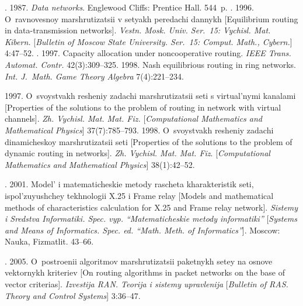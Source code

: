   \begin{multicols}{2}
  
  \renewcommand{\bibname}{\protect\rmfamily References}

{\small\frenchspacing
{%
\begin{thebibliography}{99}
  
  . 
  1987. \textit{Data networks}. Englewood Cliffs: Prentice Hall. 544~p.
. 
1996. O~ravnovesnoy marshrutizatsii v setyakh peredachi dannykh 
[Equilibrium routing in data-transmission networks]. 
\textit{Vestn. Mosk. Univ. Ser.~15: Vychisl. Mat. Kibern.}
[\textit{Bulletin of Moscow State University. Ser.~15: Comput. Math., Cybern.}] 4:47--52.
. 
1997. Capacity allocation under noncooperative routing. 
\textit{IEEE Trans. Automat. Contr.} 42(3):309--325.
 1998. 
Nash equilibrious routing in ring networks. \textit{Int. J.~Math. Game Theory Algebra}
7(4):221--234.
{

}
 1997. 
O~svoystvakh resheniy zadachi marshrutizatsii seti s virtual'nymi kanalami 
[Properties of the solutions to the problem of routing in network with virtual channels]. 
\textit{Zh. Vychisl. Mat. Mat. Fiz.} [\textit{Computational Mathematics and Mathematical 
Physics}] 37(7):785--793.
 1998. O~svoystvakh resheniy zadachi dinamicheskoy 
marshrutizatsii  seti [Properties of the solutions to the problem of dynamic routing 
in networks]. \textit{Zh. Vychisl. Mat. Mat. Fiz}. 
[\textit{Computational Mathematics and Mathematical Physics}] 38(1):42--52.

. 2001. 
Model' i matematicheskie metody rascheta kharakteristik seti, 
ispol'zuyushchey tekhnologii X.25 i Frame relay 
[Models and mathematical methods of characteristics calculation for X.25 and 
Frame relay network]. \textit{Sistemy i Sredstva Informatiki. Spec. vyp. 
``Matematicheskie metody informatiki''} 
[\textit{Systems and Means of Informatics. Spec. ed. ``Math. Meth. of Informatics''}]. 
Moscow: Nauka, Fizmatlit. 43--66.

. 2005. O~postroenii 
algoritmov marshrutizatsii paketnykh setey na osnove vektornykh kriteriev 
[On routing algorithms in packet networks on the base of vector criterias]. 
\textit{Izvestija RAN. Teorija i sistemy upravlenija} 
[\textit{Bulletin of RAS. Theory and Control Systems}] 3:36--47.


\end{thebibliography}}}
\end{multicols}
